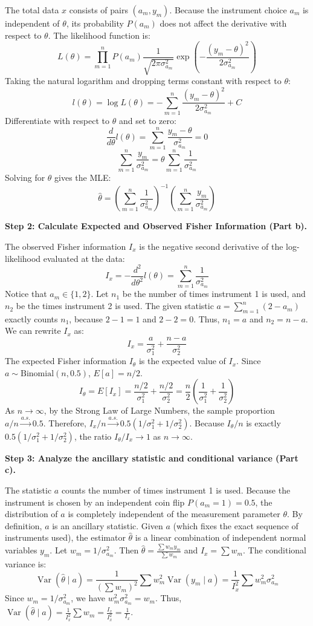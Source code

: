 \begin{solution}
The total data $x$ consists of pairs $(a_m, y_m)$. Because the instrument choice $a_m$ is independent of $\theta$, its probability $P(a_m)$ does not affect the derivative with respect to $\theta$.
The likelihood function is:
\[ L(\theta) = \prod_{m=1}^n P(a_m) \frac{1}{\sqrt{2\pi\sigma_{a_m}^2}} \exp\left( -\frac{(y_m-\theta)^2}{2\sigma_{a_m}^2} \right) \]
Taking the natural logarithm and dropping terms constant with respect to $\theta$:
\[ l(\theta) = \log L(\theta) = -\sum_{m=1}^n \frac{(y_m-\theta)^2}{2\sigma_{a_m}^2} + C \]
Differentiate with respect to $\theta$ and set to zero:
\[ \frac{d}{d\theta} l(\theta) = \sum_{m=1}^n \frac{y_m-\theta}{\sigma_{a_m}^2} = 0 \]
\[ \sum_{m=1}^n \frac{y_m}{\sigma_{a_m}^2} = \theta \sum_{m=1}^n \frac{1}{\sigma_{a_m}^2} \]
Solving for $\theta$ gives the MLE:
\[ \hat{\theta} = \left(\sum_{m=1}^n \frac{1}{\sigma_{a_m}^2}\right)^{-1} \left(\sum_{m=1}^n \frac{y_m}{\sigma_{a_m}^2}\right) \]

\textbf{Step 2: Calculate Expected and Observed Fisher Information (Part b).}

The observed Fisher information $I_x$ is the negative second derivative of the log-likelihood evaluated at the data:
\[ I_x = -\frac{d^2}{d\theta^2} l(\theta) = \sum_{m=1}^n \frac{1}{\sigma_{a_m}^2} \]
Notice that $a_m \in \{1, 2\}$. Let $n_1$ be the number of times instrument 1 is used, and $n_2$ be the times instrument 2 is used. 
The given statistic $a = \sum_{m=1}^n (2 - a_m)$ exactly counts $n_1$, because $2-1=1$ and $2-2=0$.
Thus, $n_1 = a$ and $n_2 = n - a$. We can rewrite $I_x$ as:
\[ I_x = \frac{a}{\sigma_1^2} + \frac{n-a}{\sigma_2^2} \]
The expected Fisher information $I_\theta$ is the expected value of $I_x$. Since $a \sim \text{Binomial}(n, 0.5)$, $E[a] = n/2$.
\[ I_\theta = E[I_x] = \frac{n/2}{\sigma_1^2} + \frac{n/2}{\sigma_2^2} = \frac{n}{2} \left( \frac{1}{\sigma_1^2} + \frac{1}{\sigma_2^2} \right) \]
As $n \to \infty$, by the Strong Law of Large Numbers, the sample proportion $a/n \xrightarrow{a.s.} 0.5$.
Therefore, $I_x / n \xrightarrow{a.s.} 0.5(1/\sigma_1^2 + 1/\sigma_2^2)$.
Because $I_\theta / n$ is exactly $0.5(1/\sigma_1^2 + 1/\sigma_2^2)$, the ratio $I_\theta / I_x \to 1$ as $n \to \infty$.

\textbf{Step 3: Analyze the ancillary statistic and conditional variance (Part c).}

The statistic $a$ counts the number of times instrument 1 is used. Because the instrument is chosen by an independent coin flip $P(a_m = 1) = 0.5$, the distribution of $a$ is completely independent of the measurement parameter $\theta$. By definition, $a$ is an ancillary statistic.
Given $a$ (which fixes the exact sequence of instruments used), the estimator $\hat{\theta}$ is a linear combination of independent normal variables $y_m$.
Let $w_m = 1/\sigma_{a_m}^2$. Then $\hat{\theta} = \frac{\sum w_m y_m}{\sum w_m}$ and $I_x = \sum w_m$.
The conditional variance is:
\[ \operatorname{Var}(\hat{\theta} \mid a) = \frac{1}{(\sum w_m)^2} \sum w_m^2 \operatorname{Var}(y_m \mid a) = \frac{1}{I_x^2} \sum w_m^2 \sigma_{a_m}^2 \]
Since $w_m = 1/\sigma_{a_m}^2$, we have $w_m^2 \sigma_{a_m}^2 = w_m$.
Thus, $\operatorname{Var}(\hat{\theta} \mid a) = \frac{1}{I_x^2} \sum w_m = \frac{I_x}{I_x^2} = \frac{1}{I_x}$.


\end{solution}
